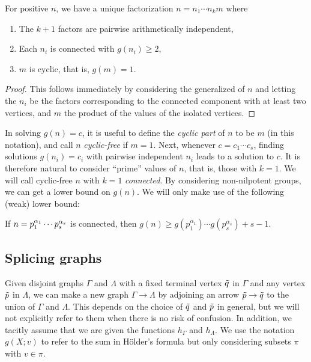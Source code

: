 \begin{prop}
	For positive $n$, we have a unique factorization $n = n_1 \cdots n_k m$ where\pagebreak[3]
	\begin{enumerate} \listspace
		\item The $k + 1$ factors are pairwise arithmetically independent,
		\item Each $n_i$ is connected with $g(n_i) \ge 2$,
		\item $m$ is cyclic, that is, $g(m) = 1$.
	\end{enumerate} \textspace
\end{prop}
\begin{proof}
	This follows immediately by considering the generalized  of $n$ and letting the $n_i$ be the factors corresponding to the connected component with at least two vertices,
	and $m$ the product of the values of the isolated vertices.
\end{proof}

In solving $g(n) = c$, it is useful to define the \emph{cyclic part} of $n$ to be $m$ (in this notation), and call $n$ \emph{cyclic-free} if $m = 1$.
Next, whenever $c = c_1 \cdots c_s$, finding solutions $g(n_i) = c_i$ with pairwise independent $n_i$ leads to a solution to $c$.
It is therefore natural to consider ``prime'' values of $n$, that is, those with $k = 1$.
We will call cyclic-free $n$ with $k = 1$ \emph{connected}.
By considering non-nilpotent groups, we can get a lower bound on $g(n)$.
We will only make use of the following (weak) lower bound:

\begin{prop}
	If $n = p_1^{\alpha_1} \cdots p_s^{\alpha_s}$ is connected, then $g(n) \ge g(p_1^{\alpha_1})\cdots g(p_s^{\alpha_s}) + s - 1.$
\end{prop}

\subsection{Splicing graphs}
Given disjoint graphs $\Gamma$ and $\Lambda$ with a fixed terminal vertex $\tilde{q}$ in $\Gamma$ and any vertex $\tilde{p}$ in $\Lambda$,
we can make a new graph $\Gamma \rightarrow \Lambda$ by adjoining an arrow $\tilde{p} \rightarrow \tilde{q}$ to the union of $\Gamma$ and $\Lambda$.
This depends on the choice of $\tilde{q}$ and $\tilde{p}$ in general, but we will not explicitly refer to them when there is no risk of confusion.
In addition, we tacitly assume that we are given the functions $h_\Gamma$ and $h_\Lambda$.
We use the notation $g(X; v)$ to refer to the sum in Hölder's formula but only considering subsets $\pi$ with $v \in \pi$.


